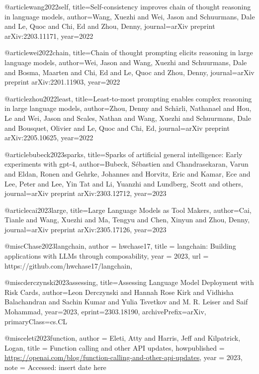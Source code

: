 @article{wang2022self,
  title={Self-consistency improves chain of thought reasoning in language models},
  author={Wang, Xuezhi and Wei, Jason and Schuurmans, Dale and Le, Quoc and Chi, Ed and Zhou, Denny},
  journal={arXiv preprint arXiv:2203.11171},
  year={2022}
}

@article{wei2022chain,
  title={Chain of thought prompting elicits reasoning in large language models},
  author={Wei, Jason and Wang, Xuezhi and Schuurmans, Dale and Bosma, Maarten and Chi, Ed and Le, Quoc and Zhou, Denny},
  journal={arXiv preprint arXiv:2201.11903},
  year={2022}
}

@article{zhou2022least,
  title={Least-to-most prompting enables complex reasoning in large language models},
  author={Zhou, Denny and Sch{\"a}rli, Nathanael and Hou, Le and Wei, Jason and Scales, Nathan and Wang, Xuezhi and Schuurmans, Dale and Bousquet, Olivier and Le, Quoc and Chi, Ed},
  journal={arXiv preprint arXiv:2205.10625},
  year={2022}
}


@article{bubeck2023sparks,
  title={Sparks of artificial general intelligence: Early experiments with gpt-4},
  author={Bubeck, S{\'e}bastien and Chandrasekaran, Varun and Eldan, Ronen and Gehrke, Johannes and Horvitz, Eric and Kamar, Ece and Lee, Peter and Lee, Yin Tat and Li, Yuanzhi and Lundberg, Scott and others},
  journal={arXiv preprint arXiv:2303.12712},
  year={2023}
}

@article{cai2023large,
  title={Large Language Models as Tool Makers},
  author={Cai, Tianle and Wang, Xuezhi and Ma, Tengyu and Chen, Xinyun and Zhou, Denny},
  journal={arXiv preprint arXiv:2305.17126},
  year={2023}
}

@misc{Chase2023langchain,
  author = {hwchase17},
  title = {langchain: Building applications with LLMs through composability},
  year = {2023},
  url = {https://github.com/hwchase17/langchain},
}

@misc{derczynski2023assessing,
      title={Assessing Language Model Deployment with Risk Cards},
      author={Leon Derczynski and Hannah Rose Kirk and Vidhisha Balachandran and Sachin Kumar and Yulia Tsvetkov and M. R. Leiser and Saif Mohammad},
      year={2023},
      eprint={2303.18190},
      archivePrefix={arXiv},
      primaryClass={cs.CL}
}

@misc{eleti2023function,
  author = {Eleti, Atty and Harris, Jeff and Kilpatrick, Logan},
  title = {Function calling and other API updates},
  howpublished = {\url{https://openai.com/blog/function-calling-and-other-api-updates}},
  year = {2023},
  note = {Accessed: insert date here}
}

